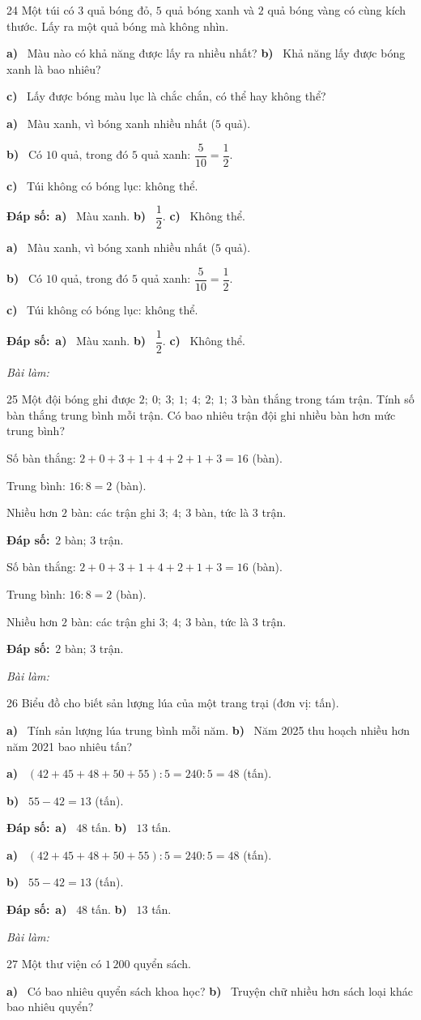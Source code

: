 \documentclass[11pt]{article}
\newif\ifsol \soltrue
\providecommand{\AnsWord}{Đáp số}
\newcommand{\dapso}[1]{\par\textbf{\AnsWord:}\ #1}
\newcommand{\probsol}[1]{%
  \begin{lrbox}{\solmeasure}\begin{minipage}{\dimexpr\linewidth-24pt\relax}#1\end{minipage}\end{lrbox}%
  \ifsol
    \begin{solbox}#1\end{solbox}%
  \else
    \setlength{\solht}{\dimexpr\ht\solmeasure+\dp\solmeasure+0.85cm\relax}%
    \ifdim\solht<1.35cm\setlength{\solht}{1.35cm}\fi
    \begin{tcolorbox}[colback=white,colframe=Line,boxrule=0.8pt,arc=5pt,
      left=8pt,right=8pt,top=4pt,bottom=4pt,height=\solht]{\footnotesize\color{Slate}\itshape\WorkWord}\end{tcolorbox}%
  \fi}
\newcommand{\pa}[1]{\textbf{#1)}\ }
\newcommand{\gap}{\vspace{0.3cm}}
\def\WorkWord{Bài làm:}
\def\AnsWord{Đáp số}
\begin{document}
\gap
\begin{probbox}{24}{\relax}
Một túi có $3$ quả bóng đỏ, $5$ quả bóng xanh và $2$ quả bóng vàng có cùng kích thước. Lấy ra một quả bóng mà không nhìn.\par
\pa{a} Màu nào có khả năng được lấy ra nhiều nhất? \quad \pa{b} Khả năng lấy được bóng xanh là bao nhiêu?\par
\pa{c} Lấy được bóng màu lục là chắc chắn, có thể hay không thể?
\end{probbox}
\probsol{
\pa{a} Màu xanh, vì bóng xanh nhiều nhất ($5$ quả).\par
\pa{b} Có $10$ quả, trong đó $5$ quả xanh: $\dfrac{5}{10}=\dfrac12$.\par
\pa{c} Túi không có bóng lục: không thể.
\dapso{\pa{a} Màu xanh. \pa{b} $\dfrac12$. \pa{c} Không thể.}}
\gap
\begin{probbox}{25}{\relax}
Một đội bóng ghi được $2;\ 0;\ 3;\ 1;\ 4;\ 2;\ 1;\ 3$ bàn thắng trong tám trận. Tính số bàn thắng trung bình mỗi trận. Có bao nhiêu trận đội ghi nhiều bàn hơn mức trung bình?
\end{probbox}
\probsol{
Số bàn thắng: $2+0+3+1+4+2+1+3=16$ (bàn).\par Trung bình: $16:8=2$ (bàn).\par Nhiều hơn $2$ bàn: các trận ghi $3;\ 4;\ 3$ bàn, tức là $3$ trận.
\dapso{$2$ bàn; $3$ trận.}}
\gap
\needspace{8.5cm}
\begin{probbox}{26}{\relax}
Biểu đồ cho biết sản lượng lúa của một trang trại (đơn vị: tấn).
\begin{center}
\end{center}
\pa{a} Tính sản lượng lúa trung bình mỗi năm. \quad \pa{b} Năm 2025 thu hoạch nhiều hơn năm 2021 bao nhiêu tấn?
\end{probbox}
\probsol{
\pa{a} $(42+45+48+50+55):5=240:5=48$ (tấn).\par
\pa{b} $55-42=13$ (tấn).
\dapso{\pa{a} $48$ tấn. \pa{b} $13$ tấn.}}
\gap
\needspace{7.5cm}
\begin{probbox}{27}{\relax}
Một thư viện có $1\,200$ quyển sách.
\begin{center}
\end{center}
\pa{a} Có bao nhiêu quyển sách khoa học? \quad \pa{b} Truyện chữ nhiều hơn sách loại khác bao nhiêu quyển?
\end{probbox}
\end{document}
